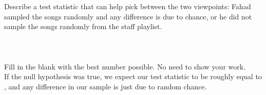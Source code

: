 \begin{enumerate}
 Describe a test statistic that can help pick between the two viewpoints: Fahad sampled the songs randomly and any difference is due to chance, or he did not sample the songs randomly from the staff playlist.   \\ \\ \\ \\ 
 Fill in the blank with the best number possible. No need to show your work. \\
If the null hypothesis was true, we expect our test statistic to be roughly equal to \underline{\hspace{3cm}}, and any difference in our sample is just due to random chance. \\ \\
\end{enumerate}